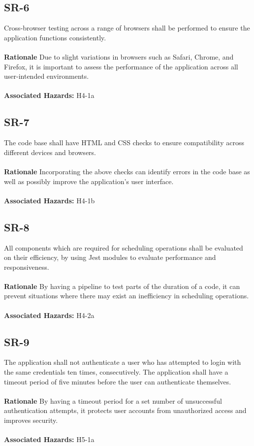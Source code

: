 \documentclass{article}
\begin{document}
\subsection*{SR-6}
Cross-browser testing across a range of browsers shall be performed to ensure the application functions consistently. \\ \\
\textbf{Rationale} Due to slight variations in browsers such as Safari, Chrome, and Firefox, it is important to assess the performance of the application across all user-intended environments. \\ \\
\textbf{Associated Hazards:} H4-1a

\subsection*{SR-7}
The code base shall have HTML and CSS checks to ensure compatibility across different devices and browsers. \\ \\
\textbf{Rationale} Incorporating the above checks can identify errors in the code base as well as possibly improve the application’s user interface. \\ \\
\textbf{Associated Hazards:} H4-1b

\subsection*{SR-8}
All components which are required for scheduling operations shall be evaluated on their efficiency, by using Jest modules to evaluate performance and responsiveness. \\ \\
\textbf{Rationale} By having a pipeline to test parts of the duration of a code, it can prevent situations where there may exist an inefficiency in scheduling operations. \\ \\
\textbf{Associated Hazards:} H4-2a

\subsection*{SR-9}
The application shall not authenticate a user who has attempted to login with the same credentials ten times, consecutively. The application shall have a timeout period of five minutes before the user can authenticate themselves. \\ \\
\textbf{Rationale} By having a timeout period for a set number of unsuccessful authentication attempts, it protects user accounts from unauthorized access and improves security. \\ \\
\textbf{Associated Hazards:} H5-1a
\end{document}
